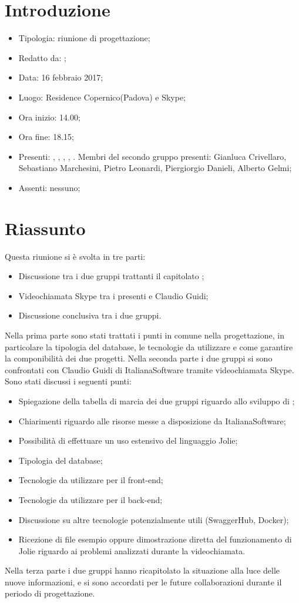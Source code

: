 \section{Introduzione}

	\begin{itemize}
		\item Tipologia: riunione di progettazione;
		\item Redatto da: \MC;
		\item Data: 16 febbraio 2017;
		\item Luogo: Residence Copernico(Padova) e Skype;
		\item Ora inizio: 14.00;
		\item Ora fine: 18.15;
		\item Presenti: \AN, \DAN, \DS, \MC, \NS. Membri del secondo gruppo presenti: Gianluca Crivellaro, Sebastiano Marchesini, Pietro Leonardi, Piergiorgio Danieli, Alberto Gelmi;	
		\item Assenti: nessuno;
	\end{itemize}

\section{Riassunto}
Questa riunione si è svolta in tre parti:
\begin{itemize}
	\item Discussione tra i due gruppi trattanti il capitolato \progetto;
	\item Videochiamata Skype tra i presenti e Claudio Guidi;
	\item Discussione conclusiva tra i due gruppi.
\end{itemize}
Nella prima parte sono stati trattati i punti in comune nella progettazione, in particolare la tipologia del database, le tecnologie da utilizzare e come garantire la componibilità dei due progetti.
Nella seconda parte i due gruppi si sono confrontati con Claudio Guidi di ItalianaSoftware tramite videochiamata Skype. Sono stati discussi i seguenti punti:
\begin{itemize}
	\item Spiegazione della tabella di marcia dei due gruppi riguardo allo sviluppo di \progetto;
	\item Chiarimenti riguardo alle risorse messe a disposizione da ItalianaSoftware;
	\item Possibilità di effettuare un uso estensivo del linguaggio Jolie;
	\item Tipologia del database;
	\item Tecnologie da utilizzare per il front-end;
	\item Tecnologie da utilizzare per il back-end;
	\item Discussione su altre tecnologie potenzialmente utili (SwaggerHub, Docker);
	\item Ricezione di file esempio oppure dimostrazione diretta del funzionamento di Jolie riguardo ai problemi analizzati durante la videochiamata.
\end{itemize}
Nella terza parte i due gruppi hanno ricapitolato la situazione alla luce delle nuove informazioni, e si sono accordati per le future collaborazioni durante il periodo di progettazione.